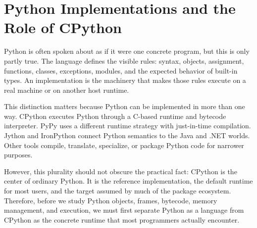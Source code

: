 \section{Python Implementations and the Role of CPython}

Python is often spoken about as if it were one concrete program, but this is only partly true. The language defines the visible rules: syntax, objects, assignment, functions, classes, exceptions, modules, and the expected behavior of built-in types. An implementation is the machinery that makes those rules execute on a real machine or on another host runtime.

This distinction matters because Python can be implemented in more than one way. CPython executes Python through a C-based runtime and bytecode interpreter. PyPy uses a different runtime strategy with just-in-time compilation. Jython and IronPython connect Python semantics to the Java and .NET worlds. Other tools compile, translate, specialize, or package Python code for narrower purposes.

However, this plurality should not obscure the practical fact: CPython is the center of ordinary Python. It is the reference implementation, the default runtime for most users, and the target assumed by much of the package ecosystem. Therefore, before we study Python objects, frames, bytecode, memory management, and execution, we must first separate Python as a language from CPython as the concrete runtime that most programmers actually encounter.